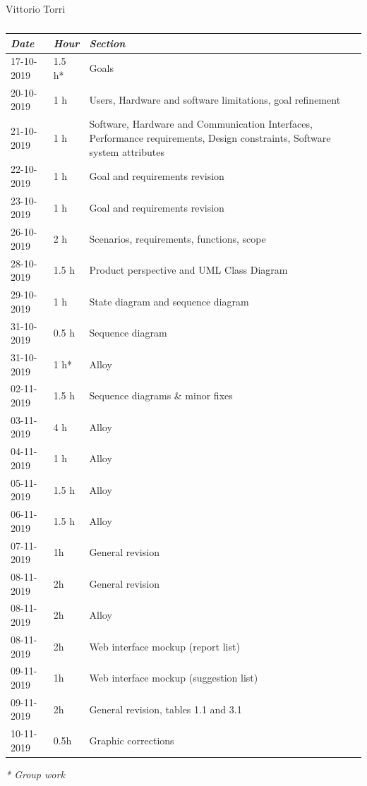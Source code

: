 \documentclass[a4paper]{report}
\begin{document}
\begin{table}[H]
\centering
Vittorio Torri \\
\begin{tabular}{p{2cm}p{1.5cm}p{7cm}}
\toprule
\textit{Date} & \textit{Hour} & \textit{Section} \\ \midrule
17-10-2019 & 1.5 h* & Goals \\ \midrule
20-10-2019 & 1 h & Users, Hardware and software limitations, goal refinement \\ \midrule
21-10-2019 & 1 h & Software, Hardware and Communication Interfaces, Performance requirements, Design constraints, Software system attributes \\ \midrule
22-10-2019 & 1 h & Goal and requirements revision \\ \midrule
23-10-2019 & 1 h & Goal and requirements revision \\ \midrule
26-10-2019 & 2 h & Scenarios, requirements, functions, scope \\  \midrule
28-10-2019 & 1.5 h & Product perspective and UML Class Diagram \\ \midrule
29-10-2019 & 1 h & State diagram and sequence diagram \\ \midrule
31-10-2019 & 0.5 h & Sequence diagram \\ \midrule
31-10-2019 & 1 h* & Alloy \\ \midrule
02-11-2019 & 1.5 h & Sequence diagrams \& minor fixes \\ \midrule
03-11-2019 & 4 h & Alloy \\ \midrule
04-11-2019 & 1 h & Alloy \\ \midrule 
05-11-2019 & 1.5 h & Alloy \\ \midrule
06-11-2019 & 1.5 h & Alloy \\ \midrule
07-11-2019 & 1h & General revision \\ \midrule
08-11-2019 & 2h & General revision \\ \midrule
08-11-2019 & 2h & Alloy \\ \midrule
08-11-2019 & 2h & Web interface mockup (report list) \\ \midrule
09-11-2019 & 1h & Web interface mockup (suggestion list) \\ \midrule
09-11-2019 & 2h & General revision, tables 1.1 and 3.1\\ \midrule
10-11-2019 & 0.5h & Graphic corrections\\
\bottomrule
\end{tabular}
\caption[Vittorio Torri's effort table]{}
\end{table}
\textit{* Group work}
\end{document}
